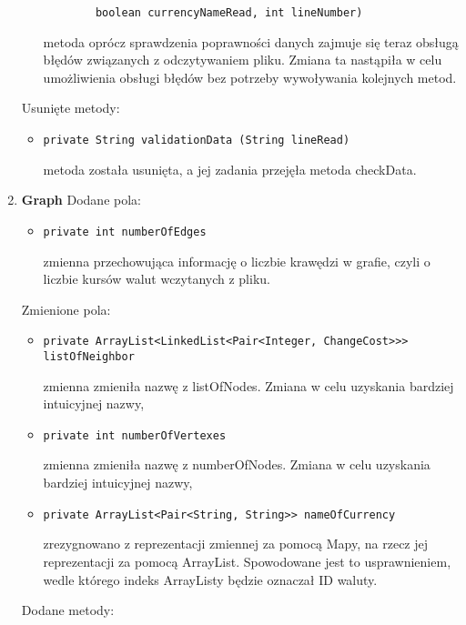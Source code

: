 \documentclass[12pt]{article}
\begin{document}
\begin{enumerate}
\begin{itemize}
\begin{verbatim}
        boolean currencyNameRead, int lineNumber)\end{verbatim}
        metoda oprócz sprawdzenia poprawności danych zajmuje się teraz obsługą błędów związanych z odczytywaniem pliku. Zmiana ta nastąpiła w celu umożliwienia obsługi błędów bez potrzeby wywoływania kolejnych metod.
        \end{itemize}
    Usunięte metody:
    \begin{itemize}
        \item \begin{verbatim}private String validationData (String lineRead)\end{verbatim}
        metoda została usunięta, a jej zadania przejęła metoda checkData.
    \end{itemize}
\item \textbf{Graph}
\newline\newline
   Dodane pola:
   \begin{itemize}
        \item \begin{verbatim}private int numberOfEdges\end{verbatim}
        zmienna przechowująca informację o liczbie krawędzi w grafie, czyli o liczbie kursów walut wczytanych z pliku.
    \end{itemize}
   Zmienione pola:
    \begin{itemize}
        \item \begin{verbatim}private ArrayList<LinkedList<Pair<Integer, ChangeCost>>> listOfNeighbor\end{verbatim}
        zmienna zmieniła nazwę z listOfNodes. Zmiana w celu uzyskania bardziej intuicyjnej nazwy,
    \item \begin{verbatim}private int numberOfVertexes\end{verbatim}
        zmienna zmieniła nazwę z numberOfNodes. Zmiana w celu uzyskania bardziej intuicyjnej nazwy,
    \item \begin{verbatim}private ArrayList<Pair<String, String>> nameOfCurrency\end{verbatim}
        zrezygnowano z reprezentacji zmiennej za pomocą Mapy, na rzecz jej reprezentacji za pomocą ArrayList. Spowodowane jest to usprawnieniem, wedle którego indeks ArrayListy będzie oznaczał ID waluty.
    \end{itemize}
    Dodane metody:

\end{enumerate}
\end{document}
